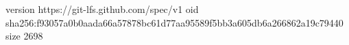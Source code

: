 version https://git-lfs.github.com/spec/v1
oid sha256:f93057a0b0aada66a57878bc61d77aa95589f5bb3a605db6a266862a19c79440
size 2698
